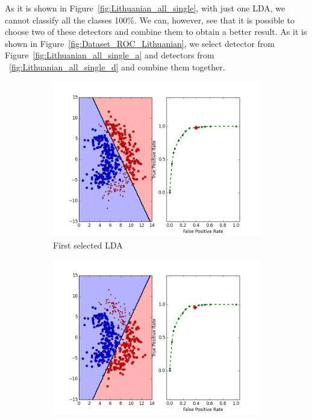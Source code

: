 As it is shown in Figure~\ref{fig:Lithuanian_all_single}, with just one LDA, we cannot classify all the classes 100\%. We can, however, see that it is possible to choose two of these detectors and combine them to obtain a better result. As it is shown in Figure~\ref{fig:Dataset_ROC_Lithuanian}, we select detector from Figure~\ref{fig:Lithuanian_all_single_a}  and detectors from ~\ref{fig:Lithuanian_all_single_d} and combine them together.

\begin{figure}[H]
    \centering
    \begin{adjustbox}{minipage=\linewidth,scale=1.1}
    \begin{subfigure}[b]{0.5\columnwidth}
        \centering
        \includegraphics[width=\linewidth]{figs/Lithuanian/20Dataset-ROC}
        \caption{First selected LDA}
        \label{fig:Dataset_ROC_Lithuanian_a} 
    \end{subfigure}
    \begin{subfigure}[b]{0.5\columnwidth}
        \centering
        \includegraphics[width=\linewidth]{figs/Lithuanian/65Dataset-ROC}

\end{subfigure}
\end{adjustbox}
\end{figure}
